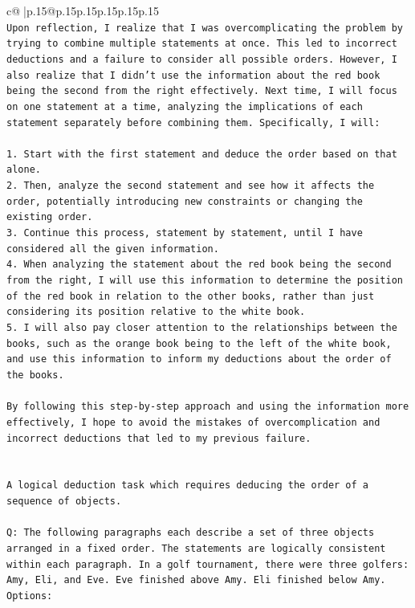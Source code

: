 \documentclass{article}
\begin{document}
{\begin{supertabular}{c@{$\;$}|p{.15\linewidth}@{}p{.15\linewidth}p{.15\linewidth}p{.15\linewidth}p{.15\linewidth}p{.15\linewidth}}
{{{\\ 
\texttt{Upon reflection, I realize that I was overcomplicating the problem by trying to combine multiple statements at once. This led to incorrect deductions and a failure to consider all possible orders. However, I also realize that I didn't use the information about the red book being the second from the right effectively. Next time, I will focus on one statement at a time, analyzing the implications of each statement separately before combining them. Specifically, I will:} \\
\\ 
\texttt{1. Start with the first statement and deduce the order based on that alone.} \\
\texttt{2. Then, analyze the second statement and see how it affects the order, potentially introducing new constraints or changing the existing order.} \\
\texttt{3. Continue this process, statement by statement, until I have considered all the given information.} \\
\texttt{4. When analyzing the statement about the red book being the second from the right, I will use this information to determine the position of the red book in relation to the other books, rather than just considering its position relative to the white book.} \\
\texttt{5. I will also pay closer attention to the relationships between the books, such as the orange book being to the left of the white book, and use this information to inform my deductions about the order of the books.} \\
\\ 
\texttt{By following this step{-}by{-}step approach and using the information more effectively, I hope to avoid the mistakes of overcomplication and incorrect deductions that led to my previous failure.} \\
\\ 
\\ 
\texttt{A logical deduction task which requires deducing the order of a sequence of objects.} \\
\\ 
\texttt{Q: The following paragraphs each describe a set of three objects arranged in a fixed order. The statements are logically consistent within each paragraph. In a golf tournament, there were three golfers: Amy, Eli, and Eve. Eve finished above Amy. Eli finished below Amy.} \\
\texttt{Options:} \\
}}}
\end{supertabular}}
\end{document}
